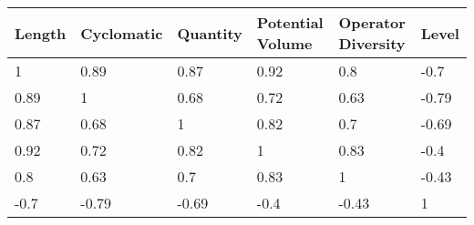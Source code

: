 \begin{tabular}{llllll}
Length & Cyclomatic & Quantity & Potential Volume & Operator Diversity & Level \\ 
\hline 
1 & 0.89 & 0.87 & 0.92 & 0.8 & -0.7 \\ 
0.89 & 1 & 0.68 & 0.72 & 0.63 & -0.79 \\ 
0.87 & 0.68 & 1 & 0.82 & 0.7 & -0.69 \\ 
0.92 & 0.72 & 0.82 & 1 & 0.83 & -0.4 \\ 
0.8 & 0.63 & 0.7 & 0.83 & 1 & -0.43 \\ 
-0.7 & -0.79 & -0.69 & -0.4 & -0.43 & 1 \\ 
\hline 
\end{tabular}